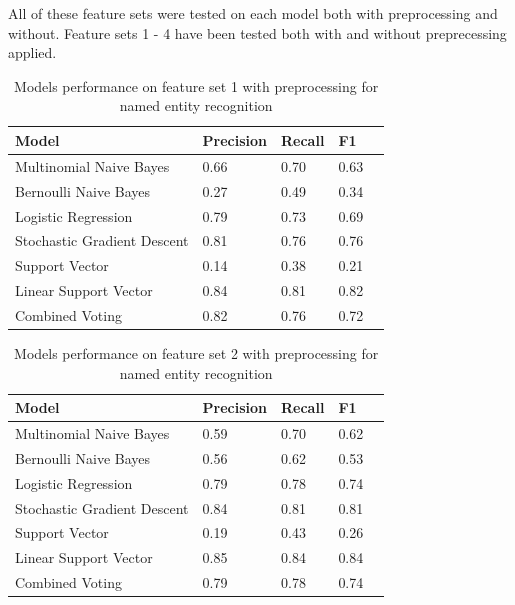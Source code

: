 \documentclass[11pt,oneside]{book}
\begin{document}
All of these feature sets were tested on each model both with preprocessing and without. Feature sets 1 - 4 have been tested both with and without preprecessing applied.

\begin{longtable}{|l|l|l|l|l|}
\caption{Models performance on feature set 1 with preprocessing for named entity recognition}
\label{tab:ner_feature_set_1}\\
\hline
\textbf{Model}          & \multicolumn{1}{c|}{\textbf{Precision}} & \multicolumn{1}{c|}{\textbf{Recall}} & \textbf{F1}  \\ \hline
\endfirsthead
%
\endhead
%
Multinomial Naive Bayes & 0.66  &  0.70   &  0.63   \\ \hline
Bernoulli Naive Bayes       & 0.27 & 0.49 & 0.34   \\ \hline
Logistic Regression         & 0.79 & 0.73 & 0.69   \\ \hline
Stochastic Gradient Descent & 0.81 & 0.76 & 0.76   \\ \hline
Support Vector              & 0.14 & 0.38 & 0.21  \\ \hline
Linear Support Vector       & 0.84 & 0.81 & 0.82  \\ \hline
Combined Voting             & 0.82 & 0.76 & 0.72  \\ \hline
\end{longtable}

\begin{longtable}{|l|l|l|l|l|}
\caption{Models performance on feature set 2 with preprocessing for named entity recognition}
\label{tab:ner_feature_set_2}\\
\hline
\textbf{Model}          & \multicolumn{1}{c|}{\textbf{Precision}} & \multicolumn{1}{c|}{\textbf{Recall}} & \textbf{F1} \\ \hline
\endfirsthead
%
\endhead
%
Multinomial Naive Bayes &  0.59  & 0.70  & 0.62 \\ \hline
Bernoulli Naive Bayes       & 0.56 & 0.62 & 0.53   \\ \hline
Logistic Regression         & 0.79 & 0.78 & 0.74  \\ \hline
Stochastic Gradient Descent & 0.84 & 0.81 & 0.81  \\ \hline
Support Vector              & 0.19 & 0.43 & 0.26  \\ \hline
Linear Support Vector       & 0.85 & 0.84 & 0.84  \\ \hline
Combined Voting             & 0.79 & 0.78 & 0.74  \\ \hline
\end{longtable}
\end{document}
